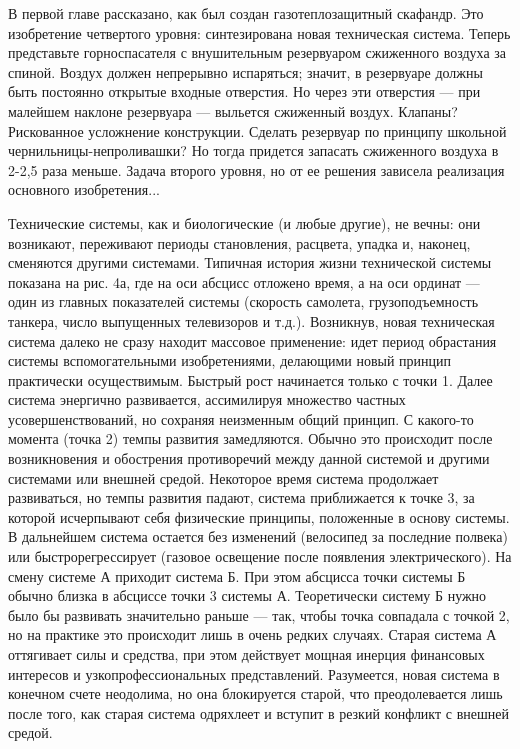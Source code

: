 В первой главе рассказано,  как был создан газотеплозащитный скафандр.
Это  изобретение четвертого  уровня:  синтезирована новая  техническая
система. Теперь представьте  горноспасателя с внушительным резервуаром
сжиженного  воздуха за  спиной. Воздух  должен непрерывно  испаряться;
значит, в резервуаре должны быть постоянно открытые входные отверстия.
Но через  эти отверстия —  при малейшем наклоне резервуара  — выльется
сжиженный воздух. Клапаны? Рискованное усложнение конструкции. Сделать
резервуар  по  принципу  школьной чернильницы-непроливашки?  Но  тогда
придется  запасать  сжиженного воздуха  в  2-2,5  раза меньше.  Задача
второго  уровня,  но  от  ее  решения  зависела  реализация  основного
изобретения...


Технические  системы,  как  и   биологические  (и  любые  другие),  не
вечны:  они  возникают,   переживают  периоды  становления,  расцвета,
упадка  и,  наконец,  сменяются другими  системами.  Типичная  история
жизни  технической системы  показана на  рис. 4а,  где на  оси абсцисс
отложено  время,  а на  оси  ординат  —  один из  главных  показателей
системы (скорость самолета, грузоподъемность танкера, число выпущенных
телевизоров  и  т.д.).  Возникнув, новая  техническая  система  далеко
не  сразу   находит  массовое   применение:  идет   период  обрастания
системы  вспомогательными   изобретениями,  делающими   новый  принцип
практически осуществимым.  Быстрый рост  начинается только с  точки 1.
Далее  система энергично  развивается,  ассимилируя множество  частных
усовершенствований, но сохраняя неизменным  общий принцип. С какого-то
момента (точка  2) темпы  развития замедляются. Обычно  это происходит
после возникновения  и обострения  противоречий между  данной системой
и  другими  системами  или  внешней средой.  Некоторое  время  система
продолжает развиваться, но темпы развития падают, система приближается
к точке 3, за которой исчерпывают себя физические принципы, положенные
в  основу  системы.  В   дальнейшем  система  остается  без  изменений
(велосипед  за  последние  полвека)  или  быстрорегрессирует  (газовое
освещение после появления электрического). На смену системе А приходит
система Б. При этом абсцисса точки  системы Б обычно близка в абсциссе
точки  3 системы  А. Теоретически  систему Б  нужно было  бы развивать
значительно раньше  — так,  чтобы точка  совпадала с  точкой 2,  но на
практике это  происходит лишь в  очень редких случаях.  Старая система
А  оттягивает  силы и  средства,  при  этом действует  мощная  инерция
финансовых интересов и узкопрофессиональных представлений. Разумеется,
новая система в  конечном счете неодолима, но  она блокируется старой,
что преодолевается  лишь после  того, как  старая система  одряхлеет и
вступит в резкий конфликт с внешней средой.

